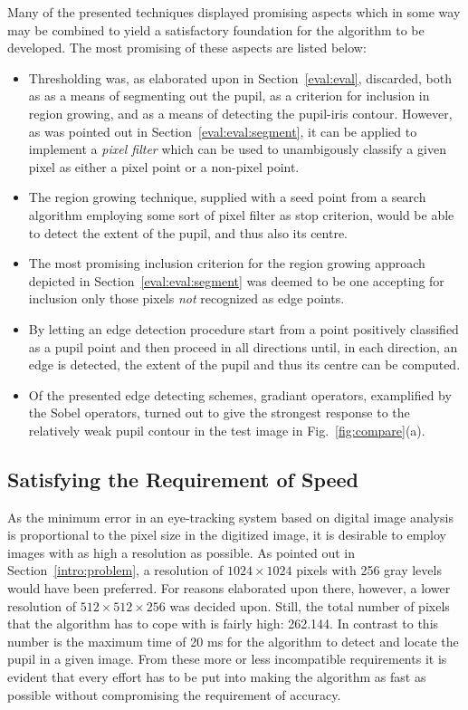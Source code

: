 Many of the presented techniques displayed promising aspects which in
some way may be combined to yield a satisfactory foundation for the
algorithm to be developed.  The most promising of these aspects are
listed below:

\begin{itemize}
\item Thresholding was, as elaborated upon in
  Section~\ref{eval:eval}, discarded, both as as a means of
  segmenting out the pupil, as a criterion for inclusion in region
  growing, and as a means of detecting the pupil-iris contour.
  However, as was pointed out in Section~\ref{eval:eval:segment}, it
  can be applied to implement a {\em pixel filter\/} which can be used
  to unambigously classify a given pixel as either a pixel point or a
  non-pixel point.
\item The region growing technique, supplied with a seed point from a
  search algorithm employing some sort of pixel filter as stop
  criterion, would be able to detect the extent of the pupil, and thus
  also its centre.
\item The most promising inclusion criterion for the region growing
  approach depicted in Section~\ref{eval:eval:segment} was deemed to
  be one accepting for inclusion only those pixels {\em not\/}
  recognized as edge points.
\item By letting an edge detection procedure start from a point
  positively classified as a pupil point and then proceed in
  all directions until, in each direction, an edge is detected, the
  extent of the pupil and thus its centre can be computed.
\item Of the presented edge detecting schemes, gradiant operators,
  examplified by the Sobel operators, turned out to give the strongest
  response to the relatively weak pupil contour in the test image in
  Fig.~\ref{fig:compare}(a).
\end{itemize}

\subsection{Satisfying the Requirement of Speed}
\label{eval:approach:speed}

As the minimum error in an eye-tracking system based on digital image
analysis is proportional to the pixel size in the digitized image, it
is desirable to employ images with as high a resolution as possible.
As pointed out in Section~\ref{intro:problem}, a resolution of
$1024\times 1024$ pixels with 256 gray levels would have been
preferred.  For reasons elaborated upon there, however, a lower
resolution of $512\times 512\times 256$ was decided upon.  Still, the
total number of pixels that the algorithm has to cope with is fairly
high: 262.144.  In contrast to this number is the maximum time of 20
ms for the algorithm to detect and locate the pupil in a given image.
From these more or less incompatible requirements it is evident that
every effort has to be put into making the algorithm as fast as
possible without compromising the requirement of accuracy.

